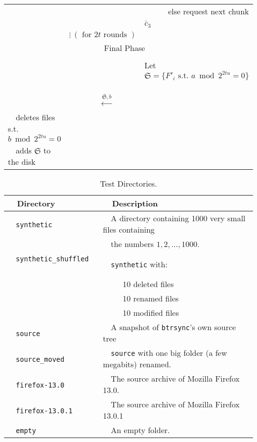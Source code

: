 \documentclass[11pt]{llncs}
\newcommand{\btrsync}{\texttt{btrsync}\xspace}
\begin{document}
\begin{center}
\begin{tabular}{lcl}
                                   &                                                      &~~~~~~else request next chunk $\bar{c}_3$~~\\
                                   &                  $\vdots~(\mbox{~for~}2t
\mbox{~rounds~})$    & \\\midrule
\multicolumn{3}{c}{{\sf Final Phase~~}} \\\midrule
                                   &                                                      & \\
                                   &                                                      &Let $\mathfrak{S}=\{F'_i \mbox{~s.t.~} a \bmod 2^{2tu} =0\}$~~\\
                                   &~~{\LARGE $\stackrel{\mathfrak{S},b}{\longleftarrow}$}&\\
                                   ~~deletes files s.t. $b \bmod 2^{2t u} =0$&        &\\
                                   ~~adds $\mathfrak{S}$ to the disk
                                   &
                                   &\\\bottomrule
\end{tabular}
\end{center}

\begin{table}
\begin{center}
\begin{tabular}{ll}\toprule
~~{\bf Directory}              ~~&~~{\bf Description}\\\midrule
~~{\tt synthetic}              ~~&~~A directory containing 1000 very small files containing~~\\
~~                             ~~&~~the numbers $1,2,\ldots,1000$. \\
~~{\tt synthetic\_shuffled}    ~~&~~{\tt synthetic} with:\\
                             ~~& ~~~~~10 deleted files\\
                             ~~& ~~~~~10 renamed files \\
                             ~~& ~~~~~10 modified files \\
~~{\tt source}                 ~~& ~~A snapshot of \btrsync's own source tree \\
~~{\tt source\_moved}          ~~& ~~{\tt source} with one big folder (a few megabits) renamed.~~\\
~~{\tt firefox-13.0}           ~~& ~~The source archive of Mozilla Firefox 13.0.\\
~~{\tt firefox-13.0.1}         ~~& ~~The source archive of Mozilla Firefox 13.0.1\\
~~{\tt empty}                  ~~& ~~An empty folder.\\\bottomrule
\end{tabular}\smallskip
  \caption{Test Directories.}
  \label{tab:benchdirec}
\end{center}
\end{table}
\end{document}
